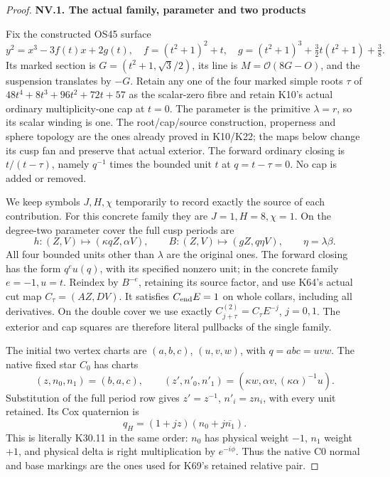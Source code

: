 \begin{proof}
\par

\medskip\noindent\textbf{NV.1. The actual family, parameter and two products}

\par\nobreak

Fix the constructed OS45 surface
\[
 y^2=x^3-3f(t)x+2g(t),\quad
 f=(t^2+1)^2+t,\quad
 g=(t^2+1)^3+\tfrac32t(t^2+1)+\tfrac38.
\]
Its marked section is \(G=(t^2+1,\sqrt3/2)\), its line is
\(M=\mathcal O(8G-O)\), and the suspension translates by \(-G\).
Retain any one of the four marked simple roots \(\tau\) of
\(48t^4+8t^3+96t^2+72t+57\) as the scalar-zero fibre and retain
K10's actual ordinary multiplicity-one cap at \(t=0\). The parameter
is the primitive \(\lambda=r\), so its scalar winding is one. The
root/cap/source construction, properness and sphere topology are the
ones already proved in K10/K22; the maps below change its cusp fan
and preserve that actual exterior. The forward ordinary closing is
\(t/(t-\tau)\), namely \(q^{-1}\) times the bounded unit \(t\) at
\(q=t-\tau=0\). No cap is added or removed.

We keep symbols \(J,H,\chi\) temporarily to record exactly the
source of each contribution. For this concrete family they are
\(J=1,H=8,\chi=1\). On the degree-two parameter cover the full cusp
periods are
\[
 h:(Z,V)\mapsto(\kappa qZ,\alpha V),\qquad
 B:(Z,V)\mapsto(gZ,q\eta V),\qquad \eta=\lambda\beta.
\tag{NV.1}
\]
All four bounded units other than \(\lambda\) are the original ones.
The forward closing has the form \(q^e u(q)\), with its specified
nonzero unit; in the concrete family \(e=-1,u=t\). Reindex by
\(B^{-e}\), retaining its source factor, and use K64's actual cut
map \(C_\tau=(AZ,DV)\). It satisfies \(C_{\rm end}E=1\) on
whole collars, including all derivatives. On the double cover we
use exactly \(C^{(2)}_{j+\tau}=C_\tau E^{-j}\), \(j=0,1\).
The exterior and cap squares are therefore literal pullbacks of the
single family.

The initial two vertex charts are \((a,b,c)\), \((u,v,w)\), with
\(q=abc=uvw\). The native fixed star \(C_0\) has charts
\[
 (z,n_0,n_1)=(b,a,c),\qquad
 (z',n'_0,n'_1)=(\kappa w,\alpha v,(\kappa\alpha)^{-1}u).
\tag{NV.2}
\]
Substitution of the full period row gives
\(z'=z^{-1}\), \(n'_i=zn_i\), with every unit retained.
Its Cox quaternion is
\[
 q_H=(1+jz)(n_0+j\overline{n_1}).
\tag{NV.3}
\]
This is literally K30.11 in the same order: \(n_0\) has physical
weight \(-1\), \(n_1\) weight \(+1\), and physical delta is right
multiplication by \(e^{-i\phi}\). Thus the native C0 normal and base
markings are the ones used for K69's retained relative pair.


\end{proof}
